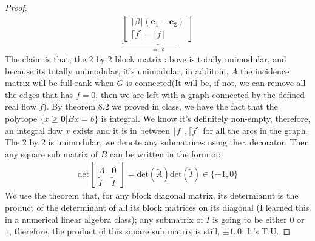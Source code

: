 \documentclass[]{article}
\theoremstyle{definition}
\begin{document}
\begin{proof}
\begin{align}
            \underbrace{\begin{bmatrix}
                \lceil \beta \rceil (\mathbf e_1 -\mathbf e_2)
                \\
                \lceil f \rceil - \lfloor f \rfloor
            \end{bmatrix}}_{=: b}
        \end{align}
        The claim is that, the 2 by 2 block matrix above is totally unimodular, and because its totally unimodular, it's unimodular, in additoin, $A$ the incidence matrix will be full rank when $G$ is connected(It will be, if not, we can remove all the edges that has $f=0$, then we are left with a graph connected by the defined real flow $f$). By theorem 8.2 we proved in class, we have the fact that the polytope $\{x\ge \mathbf 0| Bx = b\}$ is integral. We know it's definitely non-empty, therefore, an integral flow $x$ exists and it is in between $\lfloor f \rfloor, \lceil f\rceil$ for all the arcs in the graph. 
        \\
        The 2 by 2 is unimodular, we denote any submatrices using the $\tilde.$ decorator. Then any square sub matrix of $B$ can be written in the form of: 
        \begin{align}
            \text{det}\begin{bmatrix}
                \tilde{A} & \mathbf 0
                \\
                \tilde{I} & \tilde{I}
            \end{bmatrix}
            =
            \text{det}(\tilde{A})\text{det}(\tilde{I}) 
            \in \{\pm 1, 0\}
        \end{align}
        We use the theorem that, for any block diagonal matrix, its determiannt is the product of the determinant of all its block matrices on its diagonal (I learned this in a numerical linear algebra class); any submatrix of $I$ is going to be either $0$ or $1$, therefore, the product of this square sub matrix is still, $\pm 1, 0$. It's T.U. 
    \end{proof}
    
\end{document}
